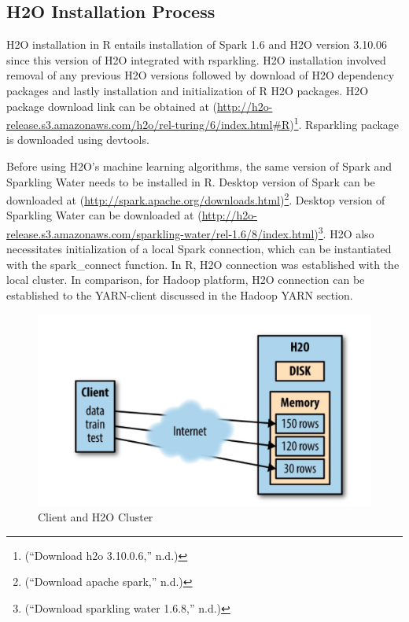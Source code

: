 \documentclass[12pt,twoside]{amherstthesis}
\begin{document}
  \subsection{H2O Installation Process}\label{h2o-installation-process}
  
  H2O installation in R entails installation of Spark 1.6 and H2O version
  3.10.06 since this version of H2O integrated with rsparkling. H2O
  installation involved removal of any previous H2O versions followed by
  download of H2O dependency packages and lastly installation and
  initialization of R H2O packages. H2O package download link can be
  obtained at
  (\url{http://h2o-release.s3.amazonaws.com/h2o/rel-turing/6/index.html\#R})\footnote{(``Download
    h2o 3.10.0.6,'' n.d.)}. Rsparkling package is downloaded using
  devtools.
  
  Before using H2O's machine learning algorithms, the same version of
  Spark and Sparkling Water needs to be installed in R. Desktop version of
  Spark can be downloaded at
  (\url{http://spark.apache.org/downloads.html})\footnote{(``Download
    apache spark,'' n.d.)}. Desktop version of Sparkling Water can be
  downloaded at
  (\url{http://h2o-release.s3.amazonaws.com/sparkling-water/rel-1.6/8/index.html})\footnote{(``Download
    sparkling water 1.6.8,'' n.d.)}. H2O also necessitates initialization
  of a local Spark connection, which can be instantiated with the
  spark\_connect function. In R, H2O connection was established with the
  local cluster. In comparison, for Hadoop platform, H2O connection can be
  established to the YARN-client discussed in the Hadoop YARN section.
  
  \begin{figure}[htbp]
  \centering
  \includegraphics[scale = 0.5,angle = 0]{figure/DataClusters.png}
  \caption[Client and H2O Cluster]{\normalsize{Client and H2O Cluster}}
  \label{fig:HyarnCluster}
  \end{figure}
  
\end{document}
